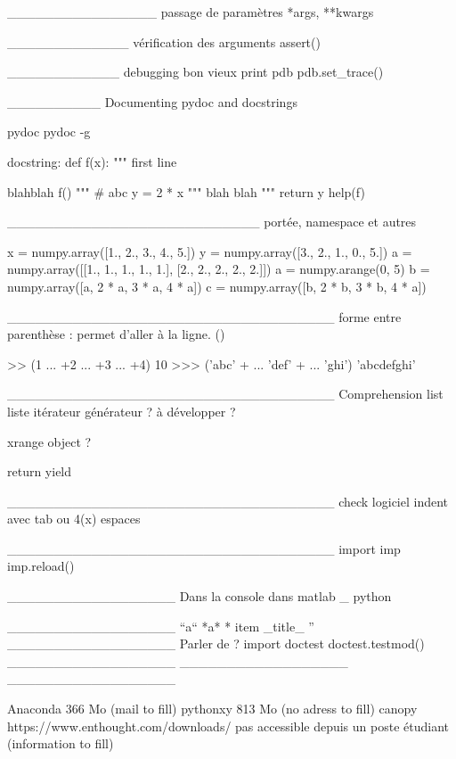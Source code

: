 ________________
passage de paramètres
*args, **kwargs 


_____________
vérification des arguments 
assert()

____________
debugging
bon vieux print
pdb
pdb.set_trace()

__________
Documenting pydoc and docstrings

pydoc
pydoc -g

docstring: 
def f(x): 
"""
first line

blahblah f()
"""
    # abc
    y = 2 * x
    """
blah
blah
  """
    return y
help(f)

___________________________
portée, namespace et autres 

x = numpy.array([1., 2., 3., 4., 5.])
y = numpy.array([3., 2., 1., 0., 5.])
a = numpy.array([[1., 1., 1., 1., 1.], [2., 2., 2., 2., 2.]])
a = numpy.arange(0, 5)
b = numpy.array([a, 2 * a, 3 * a, 4 * a])
c = numpy.array([b, 2 * b, 3 * b, 4 * a])

___________________________________
forme entre parenthèse : 
permet d'aller à la ligne. 
()
\begin{frame}
\begin{pythonConsole}
>> (1
... +2
... +3
... +4)
10
>>> ('abc' + 
... 'def' +
... 'ghi')
'abcdefghi'
\end{pythonConsole}
\end{frame}

___________________________________
Comprehension list
liste itérateur
générateur
? 
à développer ? 

xrange object ? 

return 
yield

___________________________________
check logiciel indent
avec tab ou 4(x) espaces


___________________________________
import imp
imp.reload()


__________________
Dans la console
dans matlab
_ python

__________________
``a`` 
*a*  
* item 
_title_ 
''
__________________
Parler de ? 
import doctest
doctest.testmod()
__________________
__________________
__________________

Anaconda 366 Mo (mail to fill)
pythonxy 813 Mo (no adress to fill)
canopy https://www.enthought.com/downloads/ pas accessible depuis un poste étudiant (information to fill)